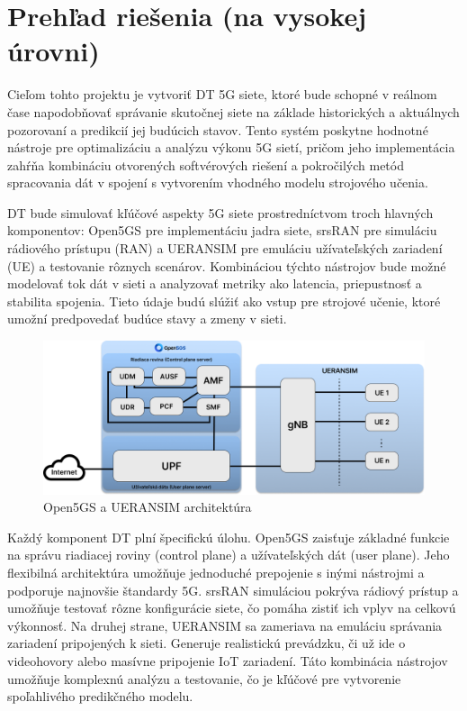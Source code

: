 \section{Prehľad riešenia (na vysokej úrovni)}

\par{
Cieľom tohto projektu je vytvoriť DT 5G siete, ktoré bude schopné v reálnom čase napodobňovať správanie skutočnej siete na základe historických a aktuálnych pozorovaní a predikcií jej budúcich stavov. Tento systém poskytne hodnotné nástroje pre optimalizáciu a analýzu výkonu 5G sietí, pričom jeho implementácia zahŕňa kombináciu otvorených softvérových riešení a pokročilých metód spracovania dát v spojení s vytvorením vhodného modelu strojového učenia.
}

\par{
DT bude simulovať kľúčové aspekty 5G siete prostredníctvom troch hlavných komponentov: Open5GS pre implementáciu jadra siete, srsRAN pre simuláciu rádiového prístupu (RAN) a UERANSIM pre emuláciu užívateľských zariadení (UE) a testovanie rôznych scenárov. Kombináciou týchto nástrojov bude možné modelovať tok dát v sieti a analyzovať metriky ako latencia, priepustnosť a stabilita spojenia. Tieto údaje budú slúžiť ako vstup pre strojové učenie, ktoré umožní predpovedať budúce stavy a zmeny v sieti.
}

\begin{figure}[H]
    \centering
    \includegraphics[width=0.7\linewidth]{assets/images/open5gs+ueran.png}
    \caption{Open5GS a UERANSIM architektúra}
\end{figure}

\par{
Každý komponent DT plní špecifickú úlohu. Open5GS zaisťuje základné funkcie na správu riadiacej roviny (control plane) a užívateľských dát (user plane). Jeho flexibilná architektúra umožňuje jednoduché prepojenie s inými nástrojmi a podporuje najnovšie štandardy 5G. srsRAN simuláciou pokrýva rádiový prístup a umožňuje testovať rôzne konfigurácie siete, čo pomáha zistiť ich vplyv na celkovú výkonnosť. Na druhej strane, UERANSIM sa zameriava na emuláciu správania zariadení pripojených k sieti. Generuje realistickú prevádzku, či už ide o videohovory alebo masívne pripojenie IoT zariadení. Táto kombinácia nástrojov umožňuje komplexnú analýzu a testovanie, čo je kľúčové pre vytvorenie spoľahlivého predikčného modelu.
}

